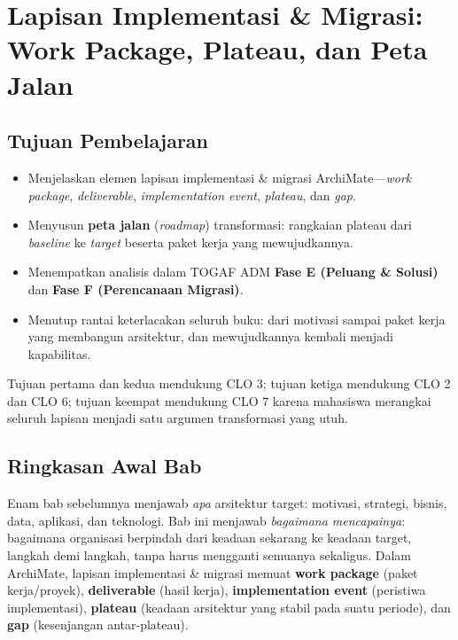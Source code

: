 \chapter[Lapisan Implementasi \& Migrasi: Peta Jalan Transformasi]{Lapisan
Implementasi \& Migrasi: Work Package, Plateau, dan Peta Jalan}
\label{ch:implementation-migration}
\setlength{\emergencystretch}{2em}

\section*{Tujuan Pembelajaran}
\begin{itemize}
  \item Menjelaskan elemen lapisan implementasi \& migrasi ArchiMate---\emph{work
        package}, \emph{deliverable}, \emph{implementation event}, \emph{plateau},
        dan \emph{gap}.
  \item Menyusun \textbf{peta jalan} (\emph{roadmap}) transformasi: rangkaian
        plateau dari \emph{baseline} ke \emph{target} beserta paket kerja yang
        mewujudkannya.
  \item Menempatkan analisis dalam TOGAF ADM \textbf{Fase E (Peluang \& Solusi)}
        dan \textbf{Fase F (Perencanaan Migrasi)}.
  \item Menutup rantai keterlacakan seluruh buku: dari motivasi sampai paket kerja
        yang membangun arsitektur, dan mewujudkannya kembali menjadi kapabilitas.
\end{itemize}

Tujuan pertama dan kedua mendukung CLO 3; tujuan ketiga mendukung CLO 2 dan
CLO 6; tujuan keempat mendukung CLO 7 karena mahasiswa merangkai seluruh lapisan
menjadi satu argumen transformasi yang utuh.

\section{Ringkasan Awal Bab}

Enam bab sebelumnya menjawab \emph{apa} arsitektur target: motivasi, strategi,
bisnis, data, aplikasi, dan teknologi. Bab ini menjawab \emph{bagaimana
mencapainya}: bagaimana organisasi berpindah dari keadaan sekarang ke keadaan
target, langkah demi langkah, tanpa harus mengganti semuanya sekaligus. Dalam
ArchiMate, lapisan implementasi \& migrasi memuat \textbf{work package} (paket
kerja/proyek), \textbf{deliverable} (hasil kerja), \textbf{implementation event}
(peristiwa implementasi), \textbf{plateau} (keadaan arsitektur yang stabil pada
suatu periode), dan \textbf{gap} (kesenjangan antar-plateau).


